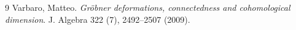 \begin{thebibliography}{9}
Varbaro, Matteo.
\newblock \emph{Gr\"obner deformations, connectedness and cohomological dimension}.
\newblock J. Algebra 322 (7), 2492--2507 (2009).
\end{thebibliography}
